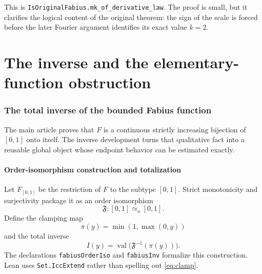 \documentclass[11pt,oneside]{article}
\theoremstyle{definition}
\theoremstyle{remark}
\newcommand{\lean}[1]{\texttt{#1}}
\begin{document}
This is \lean{IsOriginalFabius.mk\_of\_derivative\_law}.  The proof is small, but it clarifies
the logical content of the original theorem: the sign of the scale is forced before the later
Fourier argument identifies its exact value $k=2$.

\part{The inverse and the elementary-function obstruction}

\section{The total inverse of the bounded Fabius function}
\label{sec:inverse}

The main article proves that $F$ is a continuous strictly increasing bijection of $[0,1]$
onto itself.  The inverse development turns that qualitative fact into a reusable global
object whose endpoint behavior can be estimated exactly.

\subsection{Order-isomorphism construction and totalization}

Let $F_{[0,1]}$ be the restriction of $F$ to the subtype $[0,1]$.  Strict monotonicity and
surjectivity package it as an order isomorphism
\begin{equation}
 \mathfrak F:[0,1]\simeq_o[0,1].
 \label{eq:fabius-order-iso}
\end{equation}
Define the clamping map
\begin{equation}
 \pi(y)=\min(1,\max(0,y))
 \label{eq:clamp}
\end{equation}
and the total inverse
\begin{equation}
 I(y)=\operatorname{val}\bigl(\mathfrak F^{-1}(\pi(y))\bigr).
 \label{eq:total-inverse}
\end{equation}
The declarations \lean{fabiusOrderIso} and \lean{fabiusInv} formalize this construction.
Lean uses \lean{Set.IccExtend} rather than spelling out \eqref{eq:clamp}.
\end{document}
